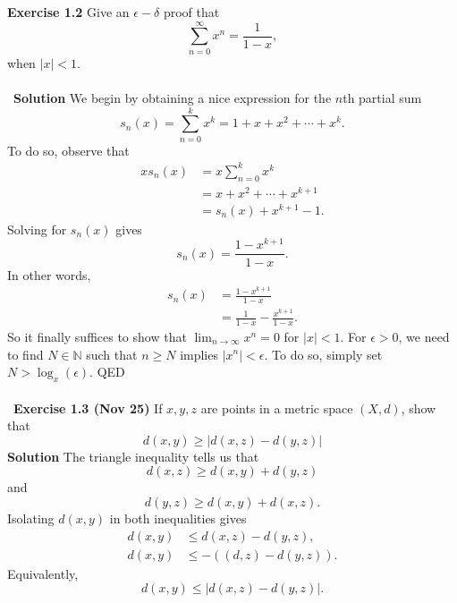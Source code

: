 \documentclass[12 pt]{article}
\newcommand{\N}{\mathbb{N}}
\numberwithin{equation}{section}
\begin{document}
{\textbf{Exercise 1.2} Give an $\epsilon-\delta$ proof that \begin{equation*}
\sum_{n=0} ^\infty x^n = \frac{1}{1 - x},
\end{equation*}
when $|x| < 1$.\\
\\
\
\textbf{Solution} We begin by obtaining a nice expression for the $n$th partial sum \begin{equation*}
s_n (x) = \sum_{n=0} ^k x^k = 1 + x + x^2 + \cdots + x^k.
\end{equation*}
To do so, observe that \begin{align*}
x s_n (x)& = x \sum_{n=0} ^k x^k \\
\ & = x + x^2 + \cdots + x^{k+1} \\
\ & = s_n (x) + x^{k+1} - 1.
\end{align*}
Solving for $s_n(x)$ gives \begin{equation*}
s_n(x) = \frac{1- x^{k+1} }{1 - x}.
\end{equation*}
In other words, \begin{align*}
s_n(x) & = \frac{1- x^{k+1} }{1 - x} \\
\ & = \frac{1}{1 - x} - \frac{x^{k+1}}{1 - x}.
\end{align*}
So it finally suffices to show that $\lim_{n \to \infty} x^n = 0$ for $|x| < 1$. For $\epsilon > 0$, we need to find $N \in \N$ such that $n \geq N$ implies $|x^n| < \epsilon$. To do so, simply set $N > \log_x (\epsilon)$. QED\\
\\
\
\textbf{Exercise 1.3 (Nov 25)} If $x, y, z$ are points in a metric space $(X, d)$, show that \begin{equation*}
d(x,y) \geq |d(x,z) - d(y,z)|
\end{equation*}
\textbf{Solution} The triangle inequality tells us that \begin{equation*}
d(x, z) \geq d(x, y) + d(y, z)
\end{equation*}
and \begin{equation*}
d(y, z) \geq d(x, y) + d(x, z).
\end{equation*}
Isolating $d(x,y)$ in both inequalities gives \begin{align*}
d(x,y) & \leq d(x,z) - d(y,z), \\
d(x,y) & \leq - ((d,z) - d(y,z)).
\end{align*}
Equivalently, \begin{equation*}
d(x,y) \leq |d(x,z) - d(y,z)|.
\end{equation*}
}
\end{document}

